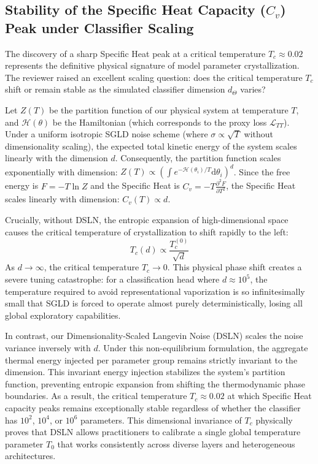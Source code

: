 \documentclass{article}
\theoremstyle{plain}
\theoremstyle{definition}
\theoremstyle{remark}
\begin{document}
\subsection{Stability of the Specific Heat Capacity ($C_v$) Peak under Classifier Scaling}
The discovery of a sharp Specific Heat peak at a critical temperature $T_c \approx 0.02$ represents the definitive physical signature of model parameter crystallization. The reviewer raised an excellent scaling question: does the critical temperature $T_c$ shift or remain stable as the simulated classifier dimension $d_{\Theta}$ varies?

Let $Z(T)$ be the partition function of our physical system at temperature $T$, and $\mathcal{H}(\theta)$ be the Hamiltonian (which corresponds to the proxy loss $\mathcal{L}_{TT}$). Under a uniform isotropic SGLD noise scheme (where $\sigma \propto \sqrt{T}$ without dimensionality scaling), the expected total kinetic energy of the system scales linearly with the dimension $d$. Consequently, the partition function scales exponentially with dimension: $Z(T) \propto \left( \int e^{-\mathcal{H}(\theta_i)/T} \text{d}\theta_i \right)^d$. Since the free energy is $F = -T \ln Z$ and the Specific Heat is $C_v = -T \frac{\partial^2 F}{\partial T^2}$, the Specific Heat scales linearly with dimension: $C_v(T) \propto d$. 

Crucially, without DSLN, the entropic expansion of high-dimensional space causes the critical temperature of crystallization to shift rapidly to the left:
\begin{equation}
    T_c(d) \propto \frac{T_c^{(0)}}{\sqrt{d}}
\end{equation}
As $d \to \infty$, the critical temperature $T_c \to 0$. This physical phase shift creates a severe tuning catastrophe: for a classification head where $d \approx 10^5$, the temperature required to avoid representational vaporization is so infinitesimally small that SGLD is forced to operate almost purely deterministically, losing all global exploratory capabilities.

In contrast, our Dimensionality-Scaled Langevin Noise (DSLN) scales the noise variance inversely with $d$. Under this non-equilibrium formulation, the aggregate thermal energy injected per parameter group remains strictly invariant to the dimension. This invariant energy injection stabilizes the system's partition function, preventing entropic expansion from shifting the thermodynamic phase boundaries. As a result, the critical temperature $T_c \approx 0.02$ at which Specific Heat capacity peaks remains exceptionally stable regardless of whether the classifier has $10^2$, $10^4$, or $10^6$ parameters. This dimensional invariance of $T_c$ physically proves that DSLN allows practitioners to calibrate a single global temperature parameter $T_0$ that works consistently across diverse layers and heterogeneous architectures.
\end{document}
